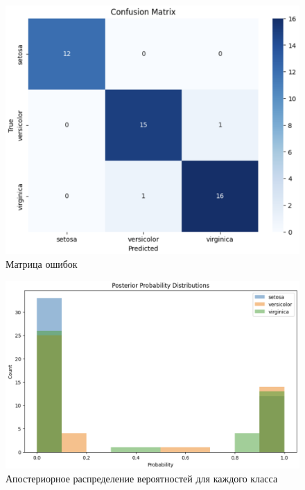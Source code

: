 \begin{figure}
	\begin{center}
		\includegraphics[width=\textwidth]{images/8.png}
	\end{center}
	\caption{Матрица ошибок}
	\label{img:8}
\end{figure}

\begin{figure}
	\begin{center}
		\includegraphics[width=\textwidth]{images/9.png}
	\end{center}
	\caption{Апостериорное распределение вероятностей для каждого класса}
	\label{img:9}
\end{figure}

\clearpage
